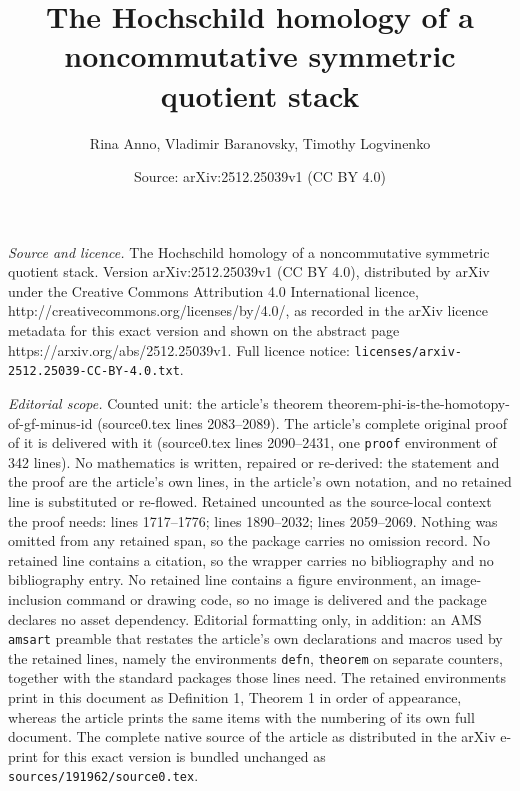 \documentclass[10pt,a4paper]{amsart}
\title{The Hochschild homology of a noncommutative symmetric quotient stack}
\author{Rina Anno, Vladimir Baranovsky, Timothy Logvinenko}
\date{Source: arXiv:2512.25039v1 (CC BY 4.0)}
\begin{document}
\maketitle

\noindent\emph{Source and licence.} The Hochschild homology of a noncommutative symmetric quotient stack. Version arXiv:2512.25039v1 (CC BY 4.0), distributed by arXiv under the Creative Commons Attribution 4.0 International licence, http://creativecommons.org/licenses/by/4.0/, as recorded in the arXiv licence metadata for this exact version and shown on the abstract page https://arxiv.org/abs/2512.25039v1. Full licence notice: \texttt{licenses/arxiv-2512.25039-CC-BY-4.0.txt}.\par\smallskip

\noindent\textit{Editorial scope.} Counted unit: the article's theorem theorem-phi-is-the-homotopy-of-gf-minus-id (source0.tex lines 2083--2089). The article's complete original proof of it is delivered with it (source0.tex lines 2090--2431, one \texttt{proof} environment of 342 lines). No mathematics is written, repaired or re-derived: the statement and the proof are the article's own lines, in the article's own notation, and no retained line is substituted or re-flowed.  Retained uncounted as the source-local context the proof needs: lines 1717--1776; lines 1890--2032; lines 2059--2069.  Nothing was omitted from any retained span, so the package carries no omission record.  No retained line contains a citation, so the wrapper carries no bibliography and no bibliography entry.  No retained line contains a figure environment, an image-inclusion command or drawing code, so no image is delivered and the package declares no asset dependency.  Editorial formatting only, in addition: an AMS \texttt{amsart} preamble that restates the article's own declarations and macros used by the retained lines, namely the environments \texttt{defn}, \texttt{theorem} on separate counters, together with the standard packages those lines need.  The retained environments print in this document as Definition 1, Theorem 1 in order of appearance, whereas the article prints the same items with the numbering of its own full document.  The complete native source of the article as distributed in the arXiv e-print for this exact version is bundled unchanged as \texttt{sources/191962/source0.tex}.
\end{document}
